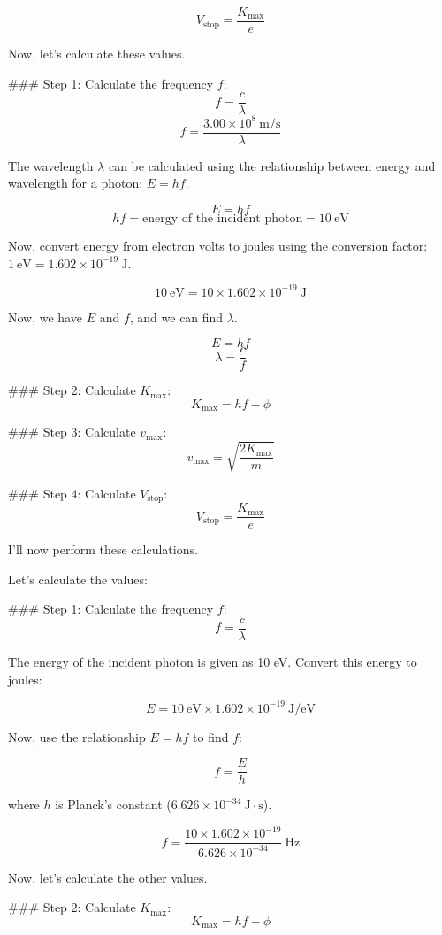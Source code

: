 \documentclass[addpoints]{exam}
\begin{document}
\begin{questions}
\begin{parts}
\begin{solution}
   \[ V_{\text{stop}} = \frac{K_{\text{max}}}{e} \]

Now, let's calculate these values.

### Step 1: Calculate the frequency \( f \):
\[ f = \frac{c}{\lambda} \]
\[ f = \frac{3.00 \times 10^8 \ \text{m/s}}{\lambda} \]

The wavelength \( \lambda \) can be calculated using the relationship between energy and wavelength for a photon: \( E = hf \).

\[ E = hf \]
\[ hf = \text{energy of the incident photon} = 10 \ \text{eV} \]

Now, convert energy from electron volts to joules using the conversion factor: \( 1 \ \text{eV} = 1.602 \times 10^{-19} \ \text{J} \).

\[ 10 \ \text{eV} = 10 \times 1.602 \times 10^{-19} \ \text{J} \]

Now, we have \( E \) and \( f \), and we can find \( \lambda \).

\[ E = hf \]
\[ \lambda = \frac{c}{f} \]

### Step 2: Calculate \( K_{\text{max}} \):
\[ K_{\text{max}} = hf - \phi \]

### Step 3: Calculate \( v_{\text{max}} \):
\[ v_{\text{max}} = \sqrt{\frac{2 K_{\text{max}}}{m}} \]

### Step 4: Calculate \( V_{\text{stop}} \):
\[ V_{\text{stop}} = \frac{K_{\text{max}}}{e} \]

I'll now perform these calculations.

Let's calculate the values:

### Step 1: Calculate the frequency \( f \):
\[ f = \frac{c}{\lambda} \]

The energy of the incident photon is given as 10 eV. Convert this energy to joules:

\[ E = 10 \ \text{eV} \times 1.602 \times 10^{-19} \ \text{J/eV} \]

Now, use the relationship \( E = hf \) to find \( f \):

\[ f = \frac{E}{h} \]

where \( h \) is Planck's constant (\(6.626 \times 10^{-34} \ \text{J}\cdot\text{s}\)).

\[ f = \frac{10 \times 1.602 \times 10^{-19}}{6.626 \times 10^{-34}} \ \text{Hz} \]

Now, let's calculate the other values.

### Step 2: Calculate \( K_{\text{max}} \):
\[ K_{\text{max}} = hf - \phi \]


\end{solution}
\end{parts}
\end{questions}
\end{document}
